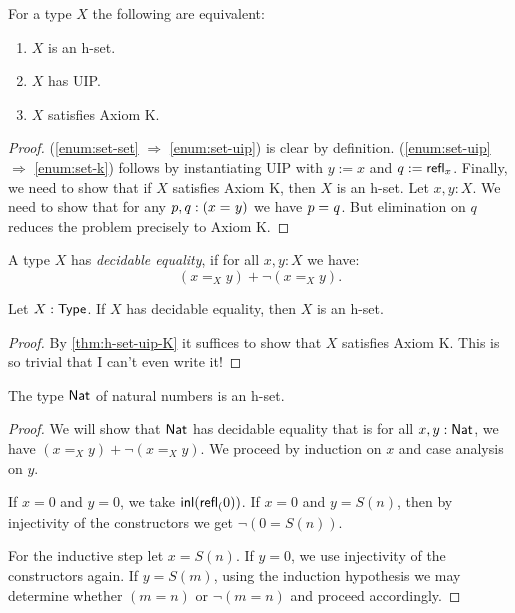 \begin{thm}\label{thm:h-set-uip-K}
 For a type $X$ the following are equivalent:
 \begin{enumerate}
  \item\label{enum:set-set} $X$ is an h-set.
  \item\label{enum:set-uip} $X$ has UIP.
  \item\label{enum:set-k} $X$ satisfies Axiom K.
 \end{enumerate}
\end{thm}

\begin{proof} (\ref{enum:set-set} $\Rightarrow$ \ref{enum:set-uip}) is clear by definition. (\ref{enum:set-uip} $\Rightarrow$ \ref{enum:set-k}) follows by instantiating UIP with $y := x$ and $q := \mathsf{refl}_{x}$.
Finally, we need to show that if $X$ satisfies Axiom K, then $X$ is an h-set. Let $x, y : X$. We need to show that for any $p, q : (x =_{} y)$ we have $p =_{} q$. But elimination on $q$ reduces the problem precisely to Axiom K.
\end{proof}

\begin{defn}
 A type $X$ has {\em decidable equality}, if for all $x, y : X$ we have:
 \[(x =_X y) + \neg (x =_X y).\]
\end{defn}

\begin{thm}
 Let $X : \mathsf{Type}$. If $X$ has decidable equality, then $X$ is an h-set.
\end{thm}

\begin{proof}
 By \autoref{thm:h-set-uip-K} it suffices to show that $X$ satisfies Axiom K. This is so trivial that I can't even write it!
\end{proof}

\begin{thm}\label{prop:nat-is-set}
 The type $\mathsf{Nat}$ of natural numbers is an h-set.
\end{thm}

\begin{proof}
 We will show that $\mathsf{Nat}$ has decidable equality that is for all $x, y : \mathsf{Nat}$, we have $(x =_X y) + \neg (x =_X y)$.
 We proceed by induction on $x$ and case analysis on $y$.

 If $x = 0$ and $y = 0$, we take $\mathsf{inl}(\mathsf{refl}_{(}0))$. If $x = 0$ and $y = S(n)$,
 then by injectivity of the constructors we get $\neg (0 = S (n))$.

 For the inductive step let $x = S (n)$. If $y = 0$, we use injectivity of the constructors again.
 If $y = S (m)$, using the induction hypothesis we may determine whether $(m = n)$ or $\neg(m = n)$ and proceed accordingly.
\end{proof}

